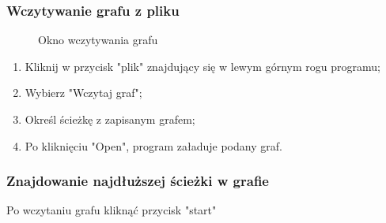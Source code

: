 \documentclass[a4paper,12pt]{article}
\begin{document}
\subsubsection{Wczytywanie grafu z pliku}
\begin{figure}[htbp]
\caption{Okno wczytywania grafu}
\end{figure}
\begin{enumerate}
\item Kliknij w przycisk "plik" znajdujący się w lewym górnym rogu programu;
\item Wybierz "Wczytaj graf";
\item Określ ścieżkę z zapisanym grafem;
\item Po kliknięciu "Open", program załaduje podany graf.
\end{enumerate}
\subsubsection{Znajdowanie najdłuższej ścieżki w grafie}
Po wczytaniu grafu kliknąć przycisk "start"
\end{document}
